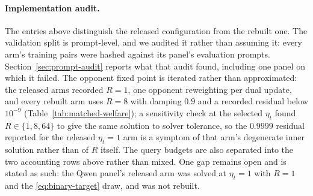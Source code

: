 \documentclass{article}
\theoremstyle{remark}
\theoremstyle{plain}
\begin{document}
\paragraph{Implementation audit.}
The entries above distinguish the released configuration from the rebuilt one. The validation
split is prompt-level, and we audited it rather than assuming it: every arm's training pairs were
hashed against its panel's evaluation prompts. Section~\ref{sec:prompt-audit} reports what that
audit found, including one panel on which it failed. The opponent fixed point is
iterated rather than approximated: the released arms recorded $R=1$, one opponent reweighting per
dual update, and every rebuilt arm uses $R=8$ with damping $0.9$ and a recorded residual below
$10^{-9}$ (Table~\ref{tab:matched-welfare}); a sensitivity check at the selected $\eta_t$ found
$R\in\{1,8,64\}$ to give the same solution to solver tolerance, so the $0.9999$ residual reported
for the released $\eta_t=1$ arm is a symptom of that arm's degenerate inner solution rather than of
$R$ itself. The query budgets are also separated into the two accounting rows above rather than
mixed. One gap remains open and is stated as such: the Qwen panel's released arm was solved at
$\eta_t=1$ with $R=1$ and the \eqref{eq:binary-target} draw, and was not rebuilt.
\end{document}
